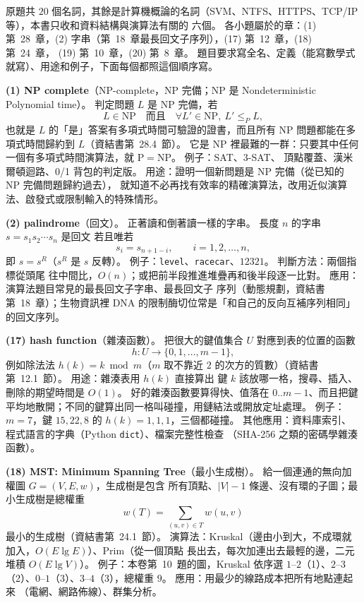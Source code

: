 \begin{pastsoln}
原題共 $20$ 個名詞，其餘是計算機概論的名詞（SVM、NTFS、HTTPS、TCP/IP 等），本書只收和資料結構與演算法有關的
六個。 各小題屬於的章：(1) 第~28~章，(2) 字串（第~18~章最長回文子序列），(17) 第~12~章，(18) 第~24~章，
(19) 第~10~章，(20) 第~8~章。 題目要求寫全名、定義（能寫數學式就寫）、用途和例子，下面每個都照這個順序寫。

\textbf{(1) NP complete}（NP-complete，NP 完備；NP 是 Nondeterministic Polynomial time）。
判定問題 $L$ 是 NP 完備，若
\[
L \in \mathrm{NP}\quad\text{而且}\quad \forall L' \in \mathrm{NP},\ L' \le_P L,
\]
也就是 $L$ 的「是」答案有多項式時間可驗證的證書，而且所有 NP 問題都能在多項式時間歸約到 $L$（資結書第~28.4~節）。
它是 NP 裡最難的一群：只要其中任何一個有多項式時間演算法，就 $\mathrm{P} = \mathrm{NP}$。 例子：SAT、3-SAT、
頂點覆蓋、漢米爾頓迴路、0/1 背包的判定版。 用途：證明一個新問題是 NP 完備（從已知的 NP 完備問題歸約過去），
就知道不必再找有效率的精確演算法，改用近似演算法、啟發式或限制輸入的特殊情形。

\textbf{(2) palindrome}（回文）。 正著讀和倒著讀一樣的字串。 長度 $n$ 的字串 $s = s_1 s_2 \cdots s_n$ 是回文
若且唯若
\[
s_i = s_{n+1-i},\qquad i = 1, 2, \ldots, n,
\]
即 $s = s^R$（$s^R$ 是 $s$ 反轉）。 例子：\texttt{level}、\texttt{racecar}、$12321$。 判斷方法：兩個指標從頭尾
往中間比，$O(n)$；或把前半段推進堆疊再和後半段逐一比對。 應用：演算法題目常見的最長回文子字串、最長回文子
序列（動態規劃，資結書第~18~章）；生物資訊裡 DNA 的限制酶切位常是「和自己的反向互補序列相同」的回文序列。

\textbf{(17) hash function}（雜湊函數）。 把很大的鍵值集合 $U$ 對應到表的位置的函數
\[
h : U \to \{0, 1, \ldots, m - 1\},
\]
例如除法法 $h(k) = k \bmod m$（$m$ 取不靠近 $2$ 的次方的質數）（資結書第~12.1~節）。 用途：雜湊表用 $h(k)$ 直接算出
鍵 $k$ 該放哪一格，搜尋、插入、刪除的期望時間是 $O(1)$。 好的雜湊函數要算得快、值落在 $0..m-1$、而且把鍵
平均地散開；不同的鍵算出同一格叫碰撞，用鏈結法或開放定址處理。 例子：$m = 7$，鍵 $15, 22, 8$ 的
$h(k) = 1, 1, 1$，三個都碰撞。 其他應用：資料庫索引、程式語言的字典（Python \texttt{dict}）、檔案完整性檢查
（SHA-256 之類的密碼學雜湊函數）。

\textbf{(18) MST: Minimum Spanning Tree}（最小生成樹）。 給一個連通的無向加權圖 $G = (V, E, w)$，生成樹是包含
所有頂點、$|V| - 1$ 條邊、沒有環的子圖；最小生成樹是總權重
\[
w(T) = \sum_{(u, v) \in T} w(u, v)
\]
最小的生成樹（資結書第~24.1~節）。 演算法：Kruskal（邊由小到大，不成環就加入，$O(E\lg E)$）、Prim（從一個頂點
長出去，每次加連出去最輕的邊，二元堆積 $O(E\lg V)$）。 例子：本卷第~10~題的圖，Kruskal 依序選
$1$--$2$（1）、$2$--$3$（2）、$0$--$1$（3）、$3$--$4$（3），總權重 $9$。 應用：用最少的線路成本把所有地點連起來
（電網、網路佈線）、群集分析。


\end{pastsoln}
